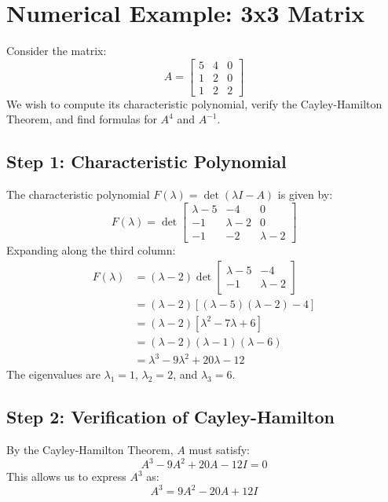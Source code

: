 \documentclass[12pt,a4paper]{report}
\theoremstyle{definition}
\numberwithin{equation}{chapter}
\begin{document}
\section{Numerical Example: 3x3 Matrix}
Consider the matrix:
\begin{equation}
A = \begin{bmatrix}
5 & 4 & 0 \\
1 & 2 & 0 \\
1 & 2 & 2
\end{bmatrix}
\end{equation}
We wish to compute its characteristic polynomial, verify the Cayley-Hamilton Theorem, and find formulas for $A^4$ and $A^{-1}$.

\subsection*{Step 1: Characteristic Polynomial}
The characteristic polynomial $F(\lambda) = \det(\lambda I - A)$ is given by:
\begin{equation}
F(\lambda) = \det \begin{bmatrix}
\lambda - 5 & -4 & 0 \\
-1 & \lambda - 2 & 0 \\
-1 & -2 & \lambda - 2
\end{bmatrix}
\end{equation}
Expanding along the third column:
\begin{equation}
\begin{aligned}
F(\lambda) &= (\lambda - 2) \det \begin{bmatrix} \lambda - 5 & -4 \\ -1 & \lambda - 2 \end{bmatrix} \\
           &= (\lambda - 2) \left[ (\lambda - 5)(\lambda - 2) - 4 \right] \\
           &= (\lambda - 2) \left[ \lambda^2 - 7\lambda + 6 \right] \\
           &= (\lambda - 2)(\lambda - 1)(\lambda - 6) \\
           &= \lambda^3 - 9\lambda^2 + 20\lambda - 12
\end{aligned}
\end{equation}
The eigenvalues are $\lambda_1 = 1$, $\lambda_2 = 2$, and $\lambda_3 = 6$.

\subsection*{Step 2: Verification of Cayley-Hamilton}
By the Cayley-Hamilton Theorem, $A$ must satisfy:
\begin{equation}\label{eq:ch_3x3}
A^3 - 9A^2 + 20A - 12I = 0
\end{equation}
This allows us to express $A^3$ as:
\begin{equation}
A^3 = 9A^2 - 20A + 12I
\end{equation}
\end{document}
